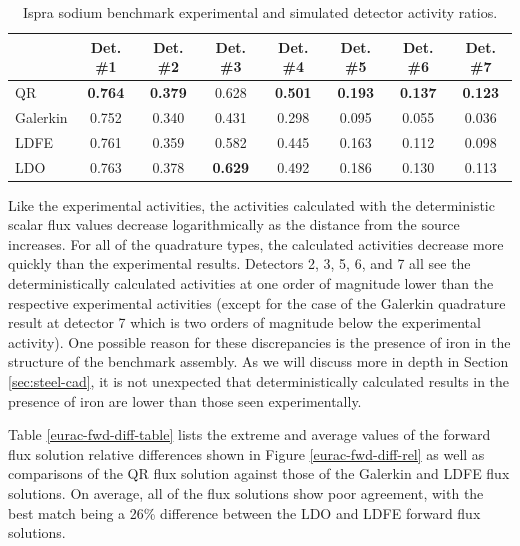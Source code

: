 \begin{table}[!htb]
\small
\centering
\caption{Ispra sodium benchmark experimental and simulated detector activity ratios.}
\label{eurac-fwd-det-ratio}
\begin{tabular}{l|ccccccc}
              & Det. \#1       & Det. \#2       & Det. \#3       & Det. \#4
              & Det. \#5       & Det. \#6       & Det. \#7       \\ \hline
QR            & \textbf{0.764} & \textbf{0.379} & 0.628          & \textbf{0.501}
              & \textbf{0.193} & \textbf{0.137} & \textbf{0.123} \\
Galerkin      & 0.752          & 0.340          & 0.431          & 0.298
              & 0.095          & 0.055          & 0.036          \\
LDFE          & 0.761          & 0.359          & 0.582          & 0.445
              & 0.163          & 0.112          & 0.098          \\
LDO           & 0.763          & 0.378          & \textbf{0.629} & 0.492
              & 0.186          & 0.130          & 0.113
\end{tabular}
\end{table}

Like the experimental activities, the 
activities calculated with the deterministic scalar flux values decrease 
logarithmically as the distance from the source increases. For all of the quadrature
types, the calculated activities decrease more quickly than the experimental results.
Detectors 2, 3, 5, 6, and 7 all see the deterministically calculated activities at
one order of magnitude lower than the respective experimental activities (except for
the case of the Galerkin quadrature result at detector 7 which is two orders of 
magnitude below the experimental activity). One possible reason for these
discrepancies is the presence of iron in the structure of the benchmark assembly. As
we will discuss more in depth in Section \ref{sec:steel-cad}, it is not unexpected
that deterministically calculated results in the presence of iron are lower
than those seen experimentally.

Table \ref{eurac-fwd-diff-table} lists the extreme and average values of the 
forward flux solution relative differences shown in Figure \ref{eurac-fwd-diff-rel} as
well as comparisons of the QR flux solution against those of the Galerkin and LDFE 
flux solutions. On average, all of the flux solutions show poor agreement, with the
best match being a 26\% difference between the LDO and LDFE forward flux solutions.


